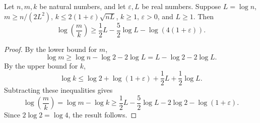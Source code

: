 \begin{lemma}\label{ProjectionSizeAnalyticLogRatioBound}
Let $n, m, k$ be natural numbers, and let $\varepsilon, L$ be real numbers.
Suppose $L = \log n$, $m \ge n / (2L^2)$, $k \le 2(1+\varepsilon)\sqrt{nL}$, $k \ge 1$, $\varepsilon > 0$, and $L \ge 1$.
Then
\[
\log\left(\frac{m}{k}\right) \ge \frac{1}{2} L - \frac{5}{2}\log L - \log(4(1+\varepsilon)).
\]
\end{lemma}
\begin{proof}
By the lower bound for $m$,
\[
\log m \ge \log n - \log 2 - 2 \log L = L - \log 2 - 2 \log L.
\]
By the upper bound for $k$,
\[
\log k \le \log 2 + \log(1+\varepsilon) + \frac{1}{2}L + \frac{1}{2}\log L.
\]
Subtracting these inequalities gives
\[
\log\left(\frac{m}{k}\right) = \log m - \log k \ge \frac{1}{2} L - \frac{5}{2}\log L - 2 \log 2 - \log(1+\varepsilon).
\]
Since $2 \log 2 = \log 4$, the result follows.
\end{proof}

